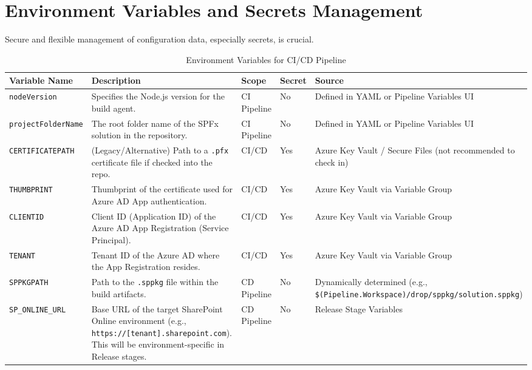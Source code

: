 \section{Environment Variables and Secrets Management}
\label{sec:EnvVariablesSecretsMgmt}

Secure and flexible management of configuration data, especially secrets, is crucial.

\begin{table}[htbp]
    \centering
    \caption{Environment Variables for CI/CD Pipeline}
    \label{tab:EnvVariablesCICD}
    \begin{tabular}{|l|p{5cm}|l|l|p{4cm}|}
        \hline
        \textbf{Variable Name} & \textbf{Description} & \textbf{Scope} & \textbf{Secret} & \textbf{Source} \\
        \hline
        \texttt{nodeVersion} & Specifies the Node.js version for the build agent. & CI Pipeline & No & Defined in YAML or Pipeline Variables UI \\
        \hline
        \texttt{projectFolderName} & The root folder name of the SPFx solution in the repository. & CI Pipeline & No & Defined in YAML or Pipeline Variables UI \\
        \hline
        \texttt{CERTIFICATEPATH} & (Legacy/Alternative) Path to a \texttt{.pfx} certificate file if checked into the repo. & CI/CD & Yes & Azure Key Vault / Secure Files (not recommended to check in) \\
        \hline
        \texttt{THUMBPRINT} & Thumbprint of the certificate used for Azure AD App authentication. & CI/CD & Yes & Azure Key Vault via Variable Group \\
        \hline
        \texttt{CLIENTID} & Client ID (Application ID) of the Azure AD App Registration (Service Principal). & CI/CD & Yes & Azure Key Vault via Variable Group \\
        \hline
        \texttt{TENANT} & Tenant ID of the Azure AD where the App Registration resides. & CI/CD & Yes & Azure Key Vault via Variable Group \\
        \hline
        \texttt{SPPKGPATH} & Path to the \texttt{.sppkg} file within the build artifacts. & CD Pipeline & No & Dynamically determined (e.g., \texttt{\$(Pipeline.Workspace)/drop/sppkg/solution.sppkg}) \\
        \hline
        \texttt{SP\_ONLINE\_URL} & Base URL of the target SharePoint Online environment (e.g., \texttt{https://[tenant].sharepoint.com}). This will be environment-specific in Release stages. & CD Pipeline & No & Release Stage Variables \\

\end{tabular}
\end{table}
